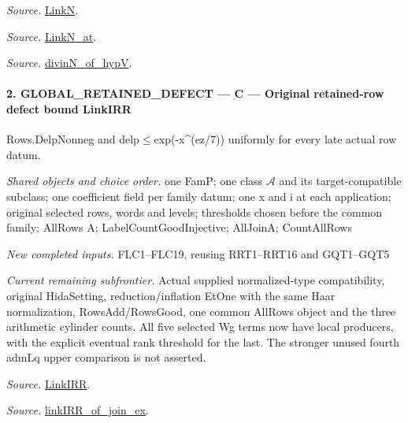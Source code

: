 \documentclass[11pt,a4paper]{article}
\numberwithin{equation}{section}
\theoremstyle{remark}\newtheorem{remark}[theorem]{Remark}
\begin{document}
\emph{Source.} \href{https://github.com/CocoSgt/riemann-hypothesis-lean/blob/7cbf7a0c32fca1badf05931879a37c3f8a2b03b4/src/Formalism/SharpRestriction/GlobalTheoremInputs.lean#L45-L48}{LinkN}.

\emph{Source.} \href{https://github.com/CocoSgt/riemann-hypothesis-lean/blob/7cbf7a0c32fca1badf05931879a37c3f8a2b03b4/src/Formalism/SharpRestriction/GlobalTheoremInputs.lean#L40-L44}{LinkN\_\allowbreak at}.

\emph{Source.} \href{https://github.com/CocoSgt/riemann-hypothesis-lean/blob/7cbf7a0c32fca1badf05931879a37c3f8a2b03b4/src/Development/AutomorphicArithmetic/CharacterBoxes/DivinNOfHypV.lean#L117-L134}{divinN\_\allowbreak of\_\allowbreak hypV}.



\paragraph{2. GLOBAL\_\allowbreak RETAINED\_\allowbreak DEFECT — C — Original retained-row defect bound LinkIRR}

Rows.DelpNonneg and delp$\le$exp(-x\textasciicircum{}(ez/7)) uniformly for every late actual row datum.

\emph{Shared objects and choice order.} one FamP; one class $\mathcal A$ and its target-compatible subclass; one coefficient field per family datum; one x and i at each application; original selected rows, words and levels; thresholds chosen before the common family; AllRows A; LabelCountGoodInjective; AllJoinA; CountAllRows

\emph{New completed inputs.} FLC1–FLC19, reusing RRT1–RRT16 and GQT1–GQT5

\emph{Current remaining subfrontier.} Actual supplied normalized-type compatibility, original HidaSetting, reduction/inflation EtOne with the same Haar normalization, RowsAdd/RowsGood, one common AllRows object and the three arithmetic cylinder counts. All five selected Wg terms now have local producers, with the explicit eventual rank threshold for the last. The stronger unused fourth admLq upper comparison is not asserted.

\emph{Source.} \href{https://github.com/CocoSgt/riemann-hypothesis-lean/blob/7cbf7a0c32fca1badf05931879a37c3f8a2b03b4/src/Formalism/SharpRestriction/GlobalTheoremInputs.lean#L55-L58}{LinkIRR}.

\emph{Source.} \href{https://github.com/CocoSgt/riemann-hypothesis-lean/blob/7cbf7a0c32fca1badf05931879a37c3f8a2b03b4/src/Development/AbelianVarietyTheory/Proofs/GlobalInterpolation/LinkIRROfJoinEx.lean#L17-L38}{linkIRR\_\allowbreak of\_\allowbreak join\_\allowbreak ex}.
\end{document}

